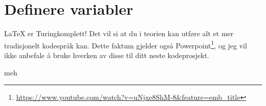 \section{Definere variabler}
    \LaTeX{} er Turingkomplett! Det vil si at du i teorien kan utføre alt et mer tradisjonelt kodespråk kan. Dette faktum gjelder også Powerpoint\footnote{\url{https://www.youtube.com/watch?v=uNjxe8ShM-8&feature=emb_title}}, og jeg vil ikke anbefale å bruke hverken av disse til ditt neste kodeprosjekt.
    
    
    \if
        meh 
    \fi
    

